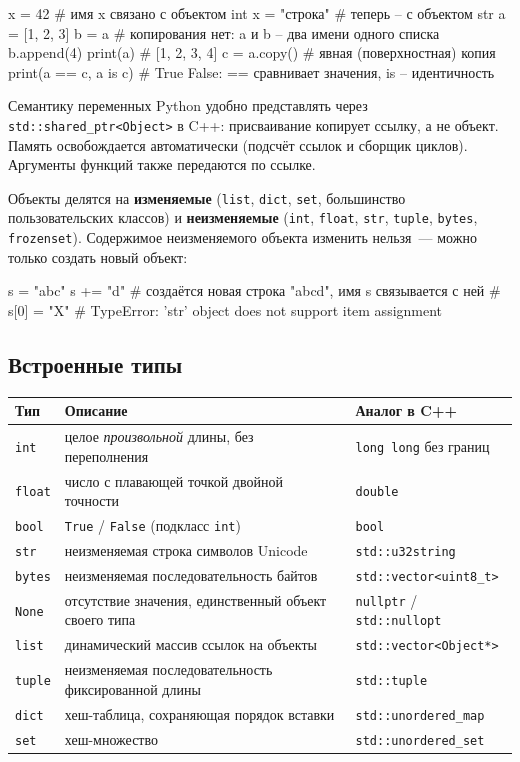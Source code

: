 \documentclass[11pt,a4paper]{article}
\newcommand{\code}[1]{\texttt{#1}}
\begin{document}
\begin{py}
x = 42          # имя x связано с объектом int
x = "строка"    # теперь -- с объектом str
a = [1, 2, 3]
b = a           # копирования нет: a и b -- два имени одного списка
b.append(4)
print(a)        # [1, 2, 3, 4]
c = a.copy()    # явная (поверхностная) копия
print(a == c, a is c)   # True False: == сравнивает значения, is -- идентичность
\end{py}

Семантику переменных Python удобно представлять через \code{std::shared\_ptr<Object>} в C++:
присваивание копирует ссылку, а не объект. Память освобождается автоматически (подсчёт ссылок
и сборщик циклов). Аргументы функций также передаются по ссылке.

Объекты делятся на \textbf{изменяемые} (\code{list}, \code{dict}, \code{set}, большинство
пользовательских классов) и \textbf{неизменяемые} (\code{int}, \code{float}, \code{str},
\code{tuple}, \code{bytes}, \code{frozenset}). Содержимое неизменяемого объекта изменить нельзя~—
можно только создать новый объект:

\begin{py}
s = "abc"
s += "d"        # создаётся новая строка "abcd", имя s связывается с ней
# s[0] = "X"    # TypeError: 'str' object does not support item assignment
\end{py}

\subsection{Встроенные типы}

\begin{tabularx}{\linewidth}{@{}lXl@{}}
\toprule
\textbf{Тип} & \textbf{Описание} & \textbf{Аналог в C++} \\
\midrule
\code{int}   & целое \emph{произвольной} длины, без переполнения & \code{long long} без границ \\
\code{float} & число с плавающей точкой двойной точности & \code{double} \\
\code{bool}  & \code{True} / \code{False} (подкласс \code{int}) & \code{bool} \\
\code{str}   & неизменяемая строка символов Unicode & \code{std::u32string} \\
\code{bytes} & неизменяемая последовательность байтов & \code{std::vector<uint8\_t>} \\
\code{None}  & отсутствие значения, единственный объект своего типа & \code{nullptr} / \code{std::nullopt} \\
\code{list}  & динамический массив ссылок на объекты & \code{std::vector<Object*>} \\
\code{tuple} & неизменяемая последовательность фиксированной длины & \code{std::tuple} \\
\code{dict}  & хеш-таблица, сохраняющая порядок вставки & \code{std::unordered\_map} \\
\code{set}   & хеш-множество & \code{std::unordered\_set} \\
\bottomrule
\end{tabularx}
\end{document}
